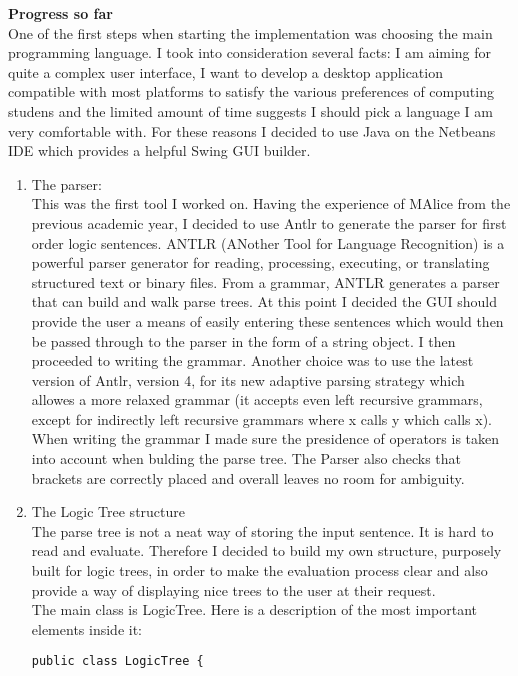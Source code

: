 \documentclass{article}
\begin{document}
\noindent\textbf{Progress so far}\\

\noindent One of the first steps when starting the implementation was choosing the main programming language. I took into consideration several facts: I am aiming for quite a complex user interface, I want to develop a desktop application compatible with most platforms to satisfy the various preferences of computing studens and the limited amount of time suggests I should pick a language I am very comfortable with. For these reasons I decided to use Java on the Netbeans IDE which provides a helpful Swing GUI builder.

	\begin{enumerate}
	\item The parser: \\
This was the first tool I worked on. Having the experience of MAlice from the previous academic year, I decided to use Antlr to generate the parser for first order logic sentences. ANTLR (ANother Tool for Language Recognition) is a powerful parser generator for reading, processing, executing, or translating structured text or binary files. From a grammar, ANTLR generates a parser that can build and walk parse trees. At this point I decided the GUI should provide the user a means of easily entering these sentences which would then be passed through to the parser in the form of a string object. I then proceeded to writing the grammar. Another choice was to use the latest version of Antlr, version 4, for its new adaptive parsing strategy which allowes a more relaxed grammar (it accepts even left recursive grammars, except for indirectly left recursive grammars where x calls y which calls x). When writing the grammar I made sure the presidence of operators is taken into account when bulding the parse tree. The Parser also checks that brackets are correctly placed and overall leaves no room for ambiguity. 

	\item The Logic Tree structure \\
The parse tree is not a neat way of storing the input sentence. It is hard to read and evaluate. Therefore I decided to build my own structure, purposely built for logic trees, in order to make the evaluation process clear and also provide a way of displaying nice trees to the user at their request.\\

\noindent The main class is LogicTree. Here is a description of the most important elements inside it:
\begin{verbatim}
public class LogicTree {


\end{verbatim}
\end{enumerate}
\end{document}
